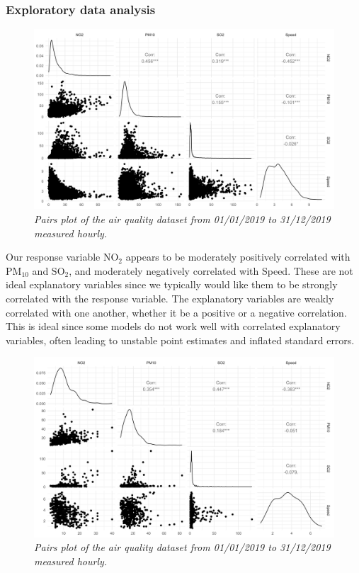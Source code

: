       \subsubsection{Exploratory data analysis}

         \begin{figure}[H]
            \centering
            \includegraphics[width=0.48\linewidth]{../images/extracted_data_pairsplot.png}
            \caption{\textit{Pairs plot of the air quality dataset from 01/01/2019 to 31/12/2019 measured hourly.}}
         \end{figure}

         Our response variable $\text{NO}_{2}$ appears to be moderately positively correlated with $\text{PM}_{10}$ and $\text{SO}_{2}$, and moderately negatively correlated with Speed. These are not ideal explanatory variables since we typically would like them to be strongly correlated with the response variable. The explanatory variables are weakly correlated with one another, whether it be a positive or a negative correlation. This is ideal since some models do not work well with correlated explanatory variables, often leading to unstable point estimates and inflated standard errors.

         \begin{figure}[H]
            \centering
            \includegraphics[width=0.48\linewidth]{../images/subset_data_pairsplot.png}
            \caption{\textit{Pairs plot of the air quality dataset from 01/01/2019 to 31/12/2019 measured hourly.}}
         \end{figure}

